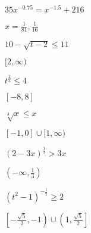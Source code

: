 \documentclass{ximera}
\begin{document}
\begin{question}
$35x^{-0.75} = x^{-1.5} +216$ %

\begin{solution}
$x = \frac{1}{81}, \frac{1}{16}$
\end{solution}

\end{question}

\begin{question}
$10-\sqrt{t-2} \leq 11$ 
\begin{solution}
$[2, \infty)$   


\end{solution}

\end{question}

\begin{question}
$t^{\frac{2}{3}} \leq 4$ %

\begin{solution}
$[-8,8]$    
\end{solution}

\end{question}

\begin{question}
$\sqrt[3]{x} \leq x$   
\begin{solution}
$[-1, 0] \cup [1, \infty)$  
\end{solution}

\end{question}

\begin{question}
$(2-3x)^{\frac{1}{3}} > 3x$  %

\begin{solution}
$\left(-\infty, \frac{1}{3} \right)$

\end{solution}

\end{question}

\begin{question}
$(t^2-1)^{-\frac{1}{2}} \geq 2$  %
\begin{solution}
$\left[ -\frac{\sqrt{5}}{2}, -1\right) \cup \left(1, \frac{\sqrt{5}}{2}\right]$
\end{solution}

\end{question}
\end{document}

